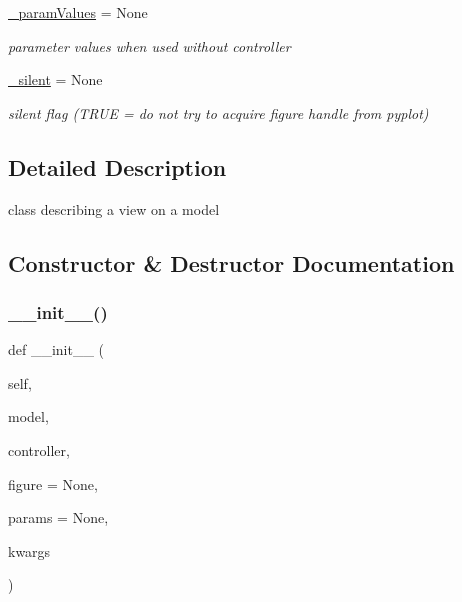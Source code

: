 \begin{DoxyCompactItemize}
\hyperlink{class_mu_mo_t_1_1_mu_mo_tview_a04608181fa27d9aad4983d3694f7ab17}{\+\_\+param\+Values} = None
\begin{DoxyCompactList}\small\item\em parameter values when used without controller \end{DoxyCompactList}\item 
\hyperlink{class_mu_mo_t_1_1_mu_mo_tview_a909146a3c119c927727c7d533042b184}{\+\_\+silent} = None
\begin{DoxyCompactList}\small\item\em silent flag (T\+R\+UE = do not try to acquire figure handle from pyplot) \end{DoxyCompactList}\end{DoxyCompactItemize}


\subsection{Detailed Description}
class describing a view on a model 

\subsection{Constructor \& Destructor Documentation}
\mbox{\label{class_mu_mo_t_1_1_mu_mo_tview_a367325b3bd7ca4a7b7ec4107f9aa6a16}} 
\subsubsection{\texorpdfstring{\+\_\+\+\_\+init\+\_\+\+\_\+()}{\_\_init\_\_()}}
{\footnotesize\ttfamily def \+\_\+\+\_\+init\+\_\+\+\_\+ (\begin{DoxyParamCaption}\item[{}]{self,  }\item[{}]{model,  }\item[{}]{controller,  }\item[{}]{figure = {\ttfamily None},  }\item[{}]{params = {\ttfamily None},  }\item[{}]{kwargs }\end{DoxyParamCaption})}




